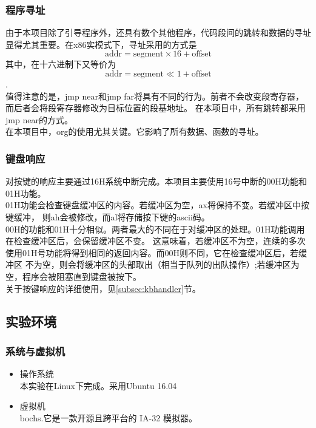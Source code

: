\documentclass[a4paper]{article}
\newcommand{\codev}[1]{\textsf{#1}}
\begin{document}
    \subsubsection{程序寻址}
    由于本项目除了引导程序外，还具有数个其他程序，代码段间的跳转和数据的寻址显得尤其重要。在x86实模式下，寻址采用的方式是
    $$ \text{addr} = \text{segment} \times 16 + \text{offset} $$
    其中，在十六进制下又等价为 $$\text{addr} = \text{segment} \ll 1 + \text{offset}$$.
    \\
    
    值得注意的是，\codev{jmp near}和\codev{jmp far}将具有不同的行为。前者不会改变段寄存器，而后者会将段寄存器修改为目标位置的段基地址。
    在本项目中，所有跳转都采用\codev{jmp near}的方式。 \\
    
    在本项目中，\codev{org}的使用尤其关键。它影响了所有数据、函数的寻址。
    \subsubsection{键盘响应} \label{subsec:kbhandlerIntro}
    对按键的响应主要通过16H系统中断完成。本项目主要使用16号中断的00H功能和01H功能。\\ 
    
    01H功能会检查键盘缓冲区的内容。若缓冲区为空，ax将保持不变。若缓冲区中按键缓冲，
    则ah会被修改，而al将存储按下键的ascii码。\\
    
    00H的功能和01H十分相似。两者最大的不同在于对缓冲区的处理。01H功能调用在检查缓冲区后，会保留缓冲区不变。
    这意味着，若缓冲区不为空，连续的多次使用01H号功能将得到相同的返回内容。而00H则不同，它在检查缓冲区后，若缓冲区
    不为空，则会将缓冲区的头部取出（相当于队列的出队操作）;若缓冲区为空，程序会被阻塞直到键盘被按下。\\ 

    关于按键响应的详细使用，见\ref{subsec:kbhandler}节。

    \subsection{实验环境}
    \subsubsection{系统与虚拟机}
        \begin{itemize} \item 操作系统 \\ 
            本实验在Linux下完成。采用Ubuntu 16.04
            \item 虚拟机\\
            bochs.它是一款开源且跨平台的 IA-32 模拟器。
        \end{itemize}
\end{document}
